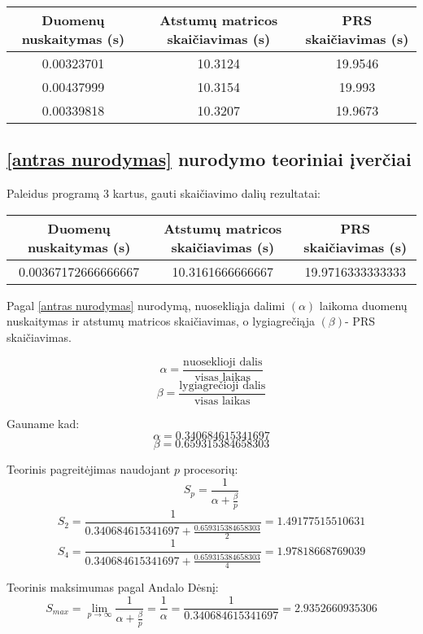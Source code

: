 \documentclass[a4paper,10pt]{article}
\begin{document}
\begin{center}
	\begin{tabular}{| c | c | c |}
		\hline
		Duomenų nuskaitymas (s) & Atstumų matricos skaičiavimas (s) & PRS skaičiavimas (s) \\
		\hline
		\num{0.00323701}        & \num{10.3124}                     & \num{19.9546}        \\
		\hline
		\num{0.00437999 }       & \num{10.3154}                     & \num{19.993}         \\
		\hline
		\num{0.00339818 }       & \num{10.3207}                     & \num{19.9673}        \\
		\hline
	\end{tabular}
\end{center}
\subsection{\ref{antras nurodymas} nurodymo teoriniai įverčiai}
Paleidus programą 3 kartus, gauti skaičiavimo dalių rezultatai:
\begin{center}
	\begin{tabular}{| c | c | c |}
		\hline
		Duomenų nuskaitymas (s)   & Atstumų matricos skaičiavimas (s) & PRS skaičiavimas (s)   \\
		\hline
		\num{0.00367172666666667} & \num{10.3161666666667}            & \num{19.9716333333333} \\
		\hline
	\end{tabular}
\end{center}

Pagal \ref{antras nurodymas} nurodymą, nuosekliąja dalimi $(\alpha)$ laikoma duomenų nuskaitymas ir atstumų matricos skaičiavimas, o lygiagrečiąja $(\beta)$- PRS skaičiavimas.

$$ \alpha = \frac {\text{nuoseklioji dalis}} {\text{visas laikas}} $$
$$ \beta = \frac {\text{lygiagrečioji dalis}} {\text{visas laikas}} $$

Gauname kad: $$\alpha = \num{0.340684615341697}$$ $$ \beta = \num{0.659315384658303} $$

Teorinis pagreitėjimas naudojant $p$ procesorių:
$$S_p = \frac {1} {\alpha + \frac{\beta} {p}} $$
$$S_2 = \frac {1} { \num{0.340684615341697}+ \frac{\num{0.659315384658303}} {2}}  = \num{1.49177515510631}$$
$$S_4 = \frac {1} { \num{0.340684615341697} + \frac{\num{0.659315384658303}} {4}}  = \num{1.97818668769039}$$

Teorinis maksimumas pagal Andalo Dėsnį:
$$ S_{max} = \lim_{p \rightarrow \infty} \frac {1} {\alpha + \frac {\beta} {p}} = \frac {1} {\alpha} = \frac {1} { \num{0.340684615341697}}= \num{2.9352660935306}$$
\newpage
\end{document}
